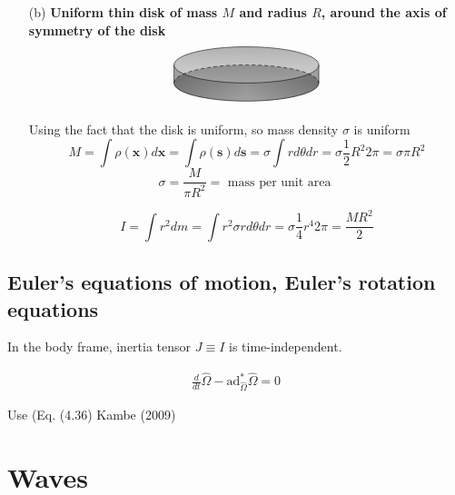 \documentclass[10pt]{amsart}
\begin{document}
\begin{multicols*}{2}
\begin{enumerate}
\item[(b)] \textbf{Uniform thin disk of mass $M$ and radius $R$, around the axis of symmetry of the disk} \\

\[
\begin{tikzpicture}
\fill[top color=gray!50!black,bottom color=gray!10,middle color=gray,shading=axis,opacity=0.25] (0,0) circle (2cm and 0.5cm);
\fill[left color=gray!50!black,right color=gray!50!black,middle color=gray!50,shading=axis,opacity=0.25] (2,0) -- (2,0.5) arc (360:180:2cm and 0.5cm) -- (-2,0) arc (180:360:2cm and 0.5cm);
\fill[top color=gray!90!,bottom color=gray!2,middle color=gray!30,shading=axis,opacity=0.25] (0,0.5) circle (2cm and 0.5cm);
\draw (-2,0.5) -- (-2,0) arc (180:360:2cm and 0.5cm) -- (2,0.5) ++ (-2,0) circle (2cm and 0.5cm);
\draw[densely dashed] (-2,0) arc (180:0:2cm and 0.5cm);
\end{tikzpicture}
\]


Using the fact that the disk is uniform, so mass density $\sigma$ is uniform
\[
M = \int \rho (\mathbf{x}) d\mathbf{x} = \int \rho(\mathbf{s}) d\mathbf{s} = \sigma \int r d\theta dr = \sigma \frac{1}{2} R^2 2\pi = \sigma \pi R^2
\]
\[
\sigma = \frac{M}{\pi R^2} = \text{ mass per unit area }
\]

\begin{equation}
I  = \int r^2 dm = \int r^2 \sigma r d\theta dr = \sigma \frac{1}{4} r^4 2\pi = \boxed{ \frac{MR^2}{2} }
\end{equation}

\end{enumerate}


\subsection{Euler's equations of motion, Euler's rotation equations}

In the body frame, inertia tensor $J \equiv I$ is time-independent.

\[
\begin{gathered}
\frac{d}{dt} \widehat{\Omega} - \text{ad}^*_{\widehat{\Omega}} \widehat{\Omega} = 0 
\end{gathered}
\]

Use (Eq. (4.36) Kambe (2009) \cite{TKambe2009}

\section{Waves}


\end{multicols*}
\end{document}
